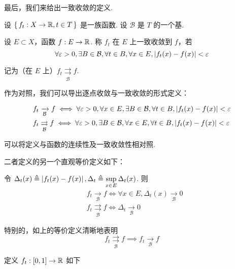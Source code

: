最后，我们来给出一致收敛的定义.

\begin{definition}
    设 $\set{f_t:X\to\mathbb{R},t\in T}$ 是一族函数. 设 $\mathcal{B}$ 是 $T$ 的一个基.

    设 $E\subset X$，函数 $f:E\to\mathbb{R}$. 称 $f_t$ 在 $E$ 上一致收敛到 $f$，若
$$
\forall\varepsilon>0,\exists B\in\mathcal{B},\forall t\in B,\forall x\in E,\left\lvert{f_t(x)-f(x)}\right\rvert<\varepsilon
$$

    记为（在 $E$ 上）$f_t\underset{\mathcal{B}}{\rightrightarrows}f$.
\end{definition}

作为对照，我们可以导出逐点收敛与一致收敛的形式定义：

$$
\begin{aligned}
    &f_t\xrightarrow[\mathcal{B}]{}f\iff\forall\varepsilon>0,\forall x\in E,\exists B\in\mathcal{B},\forall t\in B,\left\lvert{f_t(x)-f(x)}\right\rvert<\varepsilon\\
    &f_t\underset{\mathcal{B}}{\rightrightarrows}f\iff\forall\varepsilon>0,\exists B\in\mathcal{B},\forall x\in E,\forall t\in B,\left\lvert{f_t(x)-f(x)}\right\rvert<\varepsilon\\
\end{aligned}
$$

\begin{hint}
    可以将定义与函数的连续性及一致收敛性相对照.
\end{hint}

二者定义的另一个直观等价定义如下：

令 $\Delta_t(x)\triangleq\left\lvert{f_t(x)-f(x)}\right\rvert,\Delta_t\triangleq\sup\limits_{x\in E}\Delta_t(x)$. 则
$$
\begin{aligned}
    &f_t\xrightarrow[\mathcal{B}]{}f\iff\forall x\in E,\Delta_t(x)\xrightarrow[\mathcal{B}]{}0\\
    &f_t\underset{\mathcal{B}}{\rightrightarrows}f\iff\Delta_t\xrightarrow[\mathcal{B}]{}0
\end{aligned}
$$

特别的，如上的等价定义清晰地表明
$$
f_t\underset{\mathcal{B}}{\rightrightarrows}f\implies f_t\xrightarrow[\mathcal{B}]{}f
$$

\begin{example}
    定义 $f_t:[0,1]\to\mathbb{R}$ 如下

    \begin{center}
    \end{center}
\end{example}

